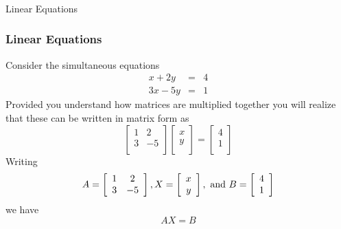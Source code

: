   \begin{frame}[fragile]\frametitle{}
\begin{center}
{\Large Linear Equations }
\end{center}
\end{frame}


  \begin{frame}[fragile]\frametitle{Linear Equations}

Consider the simultaneous equations
\begin{eqnarray*}
x + 2y &=& 4\\
3x-5y &=& 1 
\end{eqnarray*}
Provided you understand how matrices are multiplied together you will realize
that these can be written in matrix form as
$$
\left[
\begin{array}{cc}
1 & 2 \\
3 & -5 \\
\end{array}
\right]\left[
\begin{array}{c}
x \\
y\\
\end{array}\right] =\left[
\begin{array}{c}
4 \\
1\\
\end{array} 
\right]
$$
Writing
$$
A = \left[
\begin{array}{cc}
1 & 2 \\
3 & -5 \\
\end{array}
\right], X = \left[
\begin{array}{c}
x \\
y\\
\end{array}\right], \hbox { and } B=\left[
\begin{array}{c}
4 \\
1\\
\end{array} 
\right]
$$
we have
$$
AX=B
$$
\end{frame}


